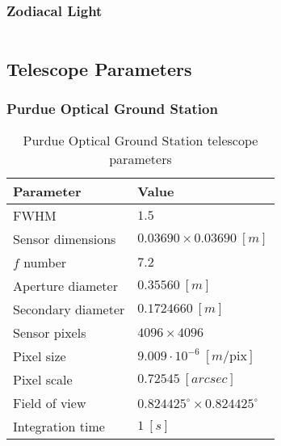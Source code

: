\subsubsection{Zodiacal Light}
\begin{listing}[H]
\inputminted[breaklines=true, breakanywhere=true, breaksymbol=\hspace{0pt}, fontsize=\footnotesize]{json}{/Users/liamrobinson/Documents/PyLightCurves/pyspaceaware/resources/data/zodiacal.json}
\end{listing}

\subsection{Telescope Parameters}

\subsubsection{Purdue Optical Ground Station}

\begin{table}[ht] \label{tb:pogs_parameters}
    \begin{tabular}{|l|l|}
    \hline
    \textbf{Parameter} & \textbf{Value} \\ \hline
    FWHM                & $1.5$                              \\ \hline
    Sensor dimensions    & $ 0.03690 \times 0.03690 \: [m]$                               \\ \hline
    $f$ number   & $7.2$                              \\ \hline
    Aperture diameter        & $0.35560 \: [m]$                              \\ \hline
    Secondary diameter         & $0.1724660 \: [m]$                              \\ \hline
    Sensor pixels               & $4096 \times 4096$                              \\ \hline
    Pixel size               & $9.009 \cdot 10^{-6} \: [m / \textrm{pix}]$                              \\ \hline
    Pixel scale               & $0.72545 \: [arcsec]$                              \\ \hline
    Field of view               & $0.824425^\circ \times 0.824425^\circ$                              \\ \hline
    Integration time               & $1 \: [s]$                              \\ \hline
    \end{tabular}
    \caption{Purdue Optical Ground Station telescope parameters}
  \end{table}


